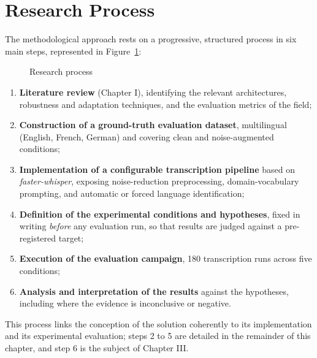 \documentclass[12pt]{report}
\begin{document}
\section{Research Process}
The methodological approach rests on a progressive, structured process in six main steps, represented in Figure~\ref{fig:process}:
\begin{figure}[H]
\centering
{}
\caption{Research process}
\label{fig:process}
\end{figure}
\begin{enumerate}
    \item \textbf{Literature review} (Chapter I), identifying the relevant architectures, robustness and adaptation techniques, and the evaluation metrics of the field;
    \item \textbf{Construction of a ground-truth evaluation dataset}, multilingual (English, French, German) and covering clean and noise-augmented conditions;
    \item \textbf{Implementation of a configurable transcription pipeline} based on \textit{faster-whisper}, exposing noise-reduction preprocessing, domain-vocabulary prompting, and automatic or forced language identification;
    \item \textbf{Definition of the experimental conditions and hypotheses}, fixed in writing \emph{before} any evaluation run, so that results are judged against a pre-registered target;
    \item \textbf{Execution of the evaluation campaign}, 180 transcription runs across five conditions;
    \item \textbf{Analysis and interpretation of the results} against the hypotheses, including where the evidence is inconclusive or negative.
\end{enumerate}
This process links the conception of the solution coherently to its implementation and its experimental evaluation; steps 2 to 5 are detailed in the remainder of this chapter, and step 6 is the subject of Chapter III.
\end{document}
